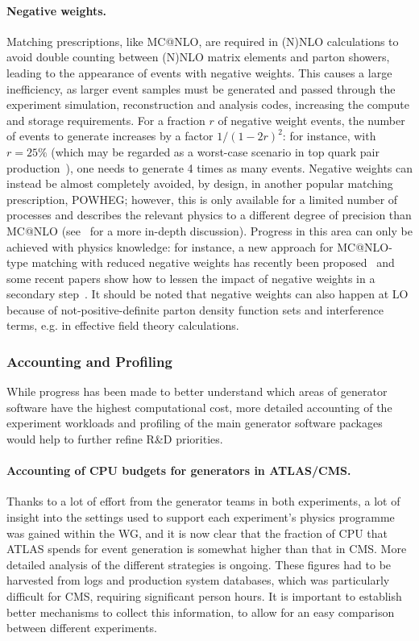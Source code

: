 \paragraph{Negative weights.} Matching prescriptions, like MC@NLO, are required
in (N)NLO calculations to avoid double counting between (N)NLO matrix
elements and parton showers, leading to the appearance of events with
negative weights. This causes a large inefficiency, as larger event
samples must be generated and passed through the experiment simulation,
reconstruction and analysis codes, increasing the compute and storage
requirements. For a fraction $r$ of negative weight events, the number of
events to generate increases by a factor $1/(1-2r)^2$: for instance,
with $r=25\%$ (which may be regarded as a worst-case scenario in top quark
pair production~\cite{Fre20}), one needs to generate 4 times as many
events. Negative weights can instead be almost completely avoided, by
design, in another popular matching prescription, POWHEG; however, this
is only available for a limited number of processes and describes the
relevant physics to a different degree of precision than MC@NLO 
(see~\cite{Fre20} for a more in-depth discussion). Progress in this area can
only be achieved with physics knowledge: for instance, a new approach for
MC@NLO-type matching with reduced negative weights has recently been
proposed~\cite{Fre20} and some recent papers show how to lessen the impact of
negative weights in a secondary step~\cite{andersen2020positive,
nachman2020neural}. It should be noted that negative weights can also happen at
LO because of not-positive-definite parton density function sets and
interference terms, e.g. in effective field theory calculations.

\subsubsection{Accounting and Profiling}

While progress has been made to better understand which areas of
generator software have the highest computational cost, more detailed
accounting of the experiment workloads and profiling of the main
generator software packages would help to further refine R\&D
priorities.

\paragraph{Accounting of CPU budgets for generators in ATLAS/CMS.} Thanks to a
lot of effort from the generator teams in both experiments, a lot of
insight into the settings used to support each experiment's physics
programme was gained within the WG, and it is now clear that the
fraction of CPU that ATLAS spends for event generation is somewhat
higher than that in CMS. More detailed analysis of the different
strategies is ongoing. These figures had to be
harvested from logs and production system databases, which was
particularly difficult for CMS, requiring significant person hours.
It is important to establish better
mechanisms to collect this information, to allow for an easy comparison
between different experiments.

